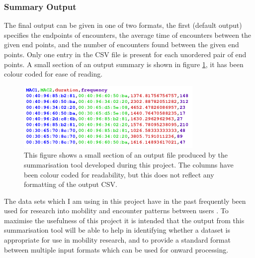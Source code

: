 \subsubsection{Summary Output}
The final output can be given in one of two formats, the first (default output) specifies the endpoints of encounters, the average time of encounters between the given end points, and the number of encounters found between the given end points. Only one entry in the CSV file is present for each unordered pair of end points. A small section of an output summary is shown in figure \ref{fig:output}, it has been colour coded for ease of reading.\newline
\begin{figure}[h]
    \centering
    \includegraphics[width=0.8\textwidth]{Output_Example_Coloured.png}
    \caption{This figure shows a small section of an output file produced by the summarisation tool developed during this project. The columns have been colour coded for readability, but this does not reflect any formatting of the output CSV.}
    \label{fig:output}
\end{figure}

The data sets which I am using in this project have in the past frequently been used for research into mobility and encounter patterns between users \cite{Scellato2011} \cite{Xiao2014} \cite{Hsu2010} \cite{Musolesi2009} \cite{Kosta2014} \cite{Kumar2009} \cite{Wei2013}. To maximise the usefulness of this project it is intended that the output from this  summarisation tool will be able to help in identifying whether a dataset is appropriate for use in mobility research, and to provide a standard format between multiple input formats which can be used for onward processing.

